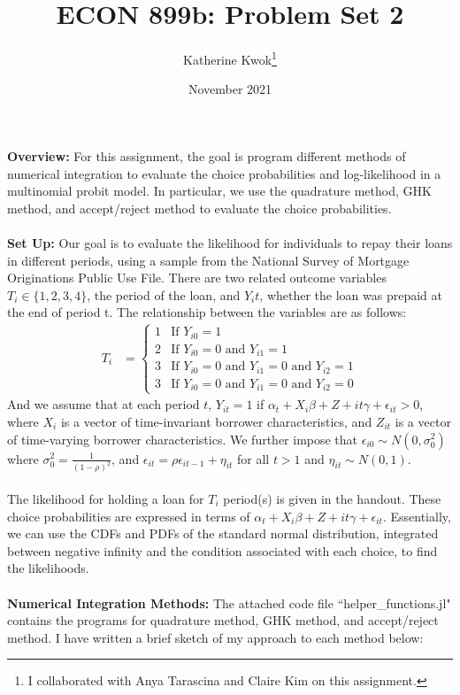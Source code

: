\documentclass[12pt]{article}
\title{ECON 899b: Problem Set 2}
\author{Katherine Kwok\footnote{I collaborated with Anya Tarascina and Claire Kim on this assignment.}}
\date{November 2021}
\begin{document}
\maketitle
\noindent \textbf{Overview:} For this assignment, the goal is program different methods of numerical integration to evaluate the choice probabilities and log-likelihood in a multinomial probit model. In particular, we use the quadrature method, GHK method, and accept/reject method to evaluate the choice probabilities. \\\\
\noindent \textbf{Set Up:} Our goal is to evaluate the likelihood for individuals to repay their loans in different periods, using a sample from the National Survey of Mortgage Originations Public Use File. There are two related outcome variables $T_i \in \{1, 2, 3, 4\}$, the period of the loan, and $Y_it$, whether the loan was prepaid at the end of period t. The relationship between the variables are as follows: 
\begin{align}
	T_i &= \begin{cases} 1 &\text{If } Y_{i0} = 1 \\
									2 & \text{If } Y_{i0} = 0 \text{ and } Y_{i1} = 1 \\
									3 & \text{If } Y_{i0} = 0 \text{ and } Y_{i1} = 0 \text{ and } Y_{i2} = 1 \\
									3 & \text{If } Y_{i0} = 0 \text{ and } Y_{i1} = 0 \text{ and } Y_{i2} = 0 \end{cases}
\end{align}
And we assume that at each period $t$, $Y_{it} = 1$ if $\alpha_t + X_i \beta + Z+{it} \gamma + \epsilon_{it} > 0$, where $X_i$ is a vector of time-invariant borrower characteristics, and $Z_{it}$ is a vector of time-varying borrower characteristics. We further impose that $\epsilon_{i0} \sim N(0, \sigma_0^2)$ where $\sigma_0^2 = \frac{1}{(1-\rho)^2}$, and $\epsilon_{it} = \rho \epsilon_{it-1} + \eta_{it}$ for all $t >1$ and $\eta_{it} \sim N(0,1)$. \\\\
The likelihood for holding a loan for $T_i$ period(s) is given in the handout. These choice probabilities are expressed in terms of $\alpha_t + X_i \beta + Z+{it} \gamma + \epsilon_{it}$. Essentially, we can use the CDFs and PDFs of the standard normal distribution, integrated between negative infinity and the condition associated with each choice, to find the likelihoods. \\\\
\textbf{Numerical Integration Methods: } The attached code file ``helper\_functions.jl" contains the programs for quadrature method, GHK method, and accept/reject method. I have written a brief sketch of my approach to each method below: 
\end{document}
